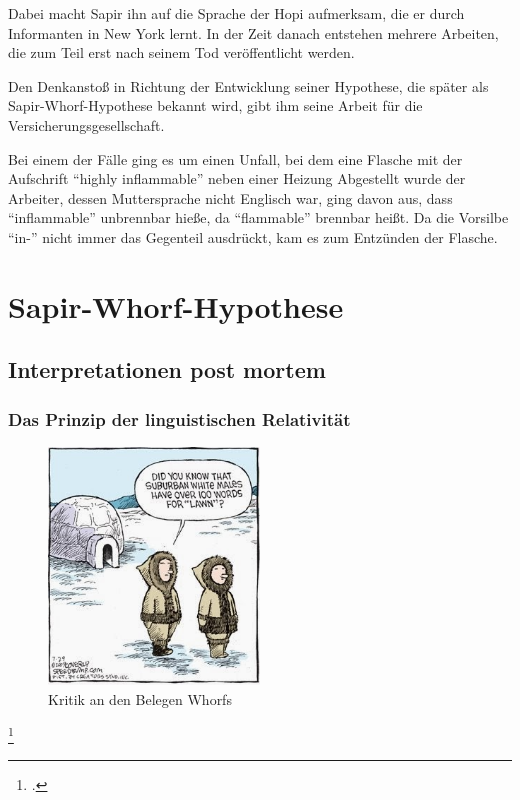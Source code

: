 \documentclass[12pt]{scrreprt}
\begin{document}
		Dabei macht Sapir ihn auf die Sprache der Hopi aufmerksam, die er durch
		Informanten in New York lernt. In der Zeit danach entstehen mehrere Arbeiten,
		die zum Teil erst nach seinem Tod veröffentlicht werden.

		Den Denkanstoß in Richtung der Entwicklung seiner Hypothese, die später als
		Sapir-Whorf-Hypothese bekannt wird, gibt ihm seine Arbeit für die
		Versicherungsgesellschaft.

		Bei einem der Fälle ging es um einen Unfall, bei dem eine Flasche mit der
		Aufschrift \enquote{highly inflammable} neben einer Heizung Abgestellt wurde
		der Arbeiter, dessen Muttersprache nicht Englisch war, ging davon aus, dass
		\enquote{inflammable} unbrennbar hieße, da \enquote{flammable} brennbar
		heißt. Da die Vorsilbe \enquote{in-} nicht immer das Gegenteil ausdrückt,
		kam es zum Entzünden der Flasche.\autocite{wiki:Benjamin_Lee_Whorf}

\chapter{Sapir-Whorf-Hypothese}
\label{chap:sphypothese}
	\section{Interpretationen post mortem}
	\label{sec:interpretpm}
		\subsection{Das Prinzip der linguistischen Relativität}
		\label{sec:lingrelativ}
		\begin{figure}[!htb]
			\centering
			\includegraphics[width=0.5\textwidth]{inuitcartoon}
			\caption[Kritik an den Belegen Whorfs {\autocite{cartoon:Inuit}}]{Kritik an den Belegen Whorfs\footnotemark}
			\label{fig:nutzlos}
		\end{figure}
		\footcitetext{cartoon:Inuit}
\end{document}
